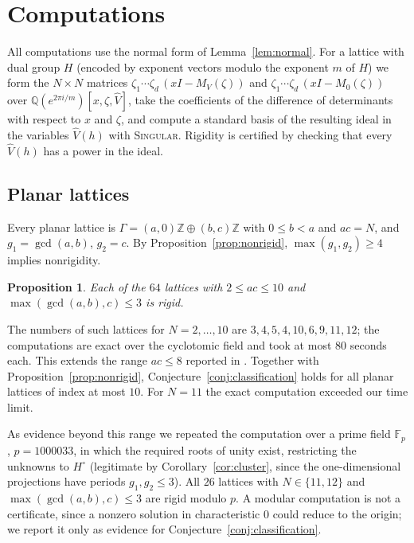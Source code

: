 \documentclass[11pt,reqno]{amsart}
\newtheorem{proposition}[theorem]{Proposition}
\theoremstyle{definition}
\theoremstyle{remark}
\newcommand{\Z}{\mathbb Z}
\newcommand{\Q}{\mathbb Q}
\begin{document}
\section{Computations}\label{sec:computations}

All computations use the normal form of Lemma~\ref{lem:normal}.  For a lattice
with dual group $H$ (encoded by exponent vectors modulo the exponent $m$ of $H$)
we form the $N\times N$ matrices $\zeta_1\cdots\zeta_d\,(xI-M_V(\zeta))$ and
$\zeta_1\cdots\zeta_d\,(xI-M_0(\zeta))$ over $\Q(e^{2\pi i/m})[x,\zeta,\widehat V]$, take the
coefficients of the difference of determinants with respect to $x$ and $\zeta$, and
compute a standard basis of the resulting ideal in the variables
$\widehat V(h)$ with \textsc{Singular}.  Rigidity is certified by checking that
every $\widehat V(h)$ has a power in the ideal.

\subsection{Planar lattices}
Every planar lattice is $\Gamma=(a,0)\Z\oplus(b,c)\Z$ with $0\le b<a$ and
$ac=N$, and $g_1=\gcd(a,b)$, $g_2=c$.  By Proposition~\ref{prop:nonrigid},
$\max(g_1,g_2)\ge4$ implies nonrigidity.

\begin{proposition}\label{prop:planar}
Each of the $64$ lattices with $2\le ac\le10$ and $\max(\gcd(a,b),c)\le3$ is rigid.
\end{proposition}

The numbers of such lattices for $N=2,\dots,10$ are $3,4,5,4,10,6,9,11,12$; the
computations are exact over the cyclotomic field and took at most $80$ seconds
each.  This extends the range $ac\le8$ reported in \cite[Section~6]{FFORS2026}.
Together with Proposition~\ref{prop:nonrigid}, Conjecture~\ref{conj:classification}
holds for all planar lattices of index at most $10$.  For $N=11$ the exact
computation exceeded our time limit.

As evidence beyond this range we repeated the computation over a prime field
$\mathbb F_p$, $p=1000033$, in which the required roots of unity exist,
restricting the unknowns to $H^\circ$ (legitimate by Corollary~\ref{cor:cluster},
since the one-dimensional projections have periods $g_1,g_2\le3$).  All $26$
lattices with $N\in\{11,12\}$ and $\max(\gcd(a,b),c)\le3$ are rigid modulo $p$.
A modular computation is not a certificate, since a nonzero solution in
characteristic $0$ could reduce to the origin; we report it only as evidence
for Conjecture~\ref{conj:classification}.
\end{document}
